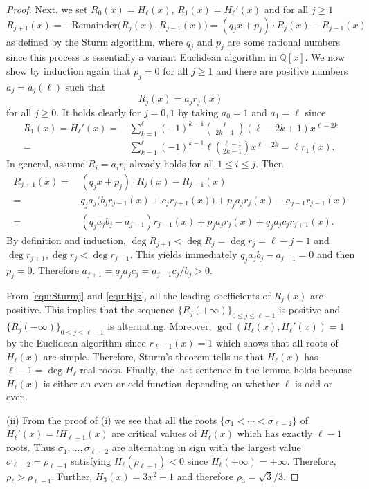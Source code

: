 \documentclass[11pt]{article}
\theoremstyle{plain}
\theoremstyle{definition}
\begin{document}
\begin{proof}
Next, we set $R_0(x)=H_{\ell}(x)$, $R_1(x)=H_{\ell}'(x)$ and for all $j\ge 1$
\begin{equation*}
     R_{j+1}(x)=-\text{Remainder}\big(R_j(x),R_{j-1}(x)\big)=(q_j x+p_j)\cdot R_j(x)-R_{j-1}(x)
\end{equation*}
as defined by the Sturm algorithm, where $q_j$ and $p_j$ are some rational numbers since this process
is essentially a variant Euclidean algorithm in ${\mathbb Q}[x]$.
We now show by induction again that $p_j=0$ for all $j\ge 1$
and there are positive numbers $a_j=a_j (\ell)$ such that
\begin{equation}\label{equ:Rjx}
     R_j(x)=a_j r_j(x)
\end{equation}
for all $j\ge 0$. It holds clearly for $j=0,1$ by taking $a_0=1$ and $a_1=\ell$ since
\begin{align*}
  R_1(x)=H_{\ell}'(x)=&\, \sum_{k=1}^\ell (-1)^{k-1} \binom{\ell}{2k-1}(\ell-2k+1) x^{\ell-2k}\\
  = &\,  \sum_{k=1}^\ell (-1)^{k-1} \ell \binom{\ell-1}{2k-1} x^{\ell-2k}= \ell r_1(x).
\end{align*}
In general, assume $R_{i}=a_i r_i$ already holds for all $1\le i\le j$. Then
\begin{align*}
     R_{j+1}(x)=&\, (q_j x+p_j)\cdot R_j(x)-R_{j-1}(x) \\
     =&\, q_ja_j \big(b_j r_{j-1}(x) +c_j r_{j+1}(x)\big)+p_j a_j r_j(x)-a_{j-1} r_{j-1}(x) \\
     =&\, (q_ja_jb_j-a_{j-1}) r_{j-1}(x)+p_j a_j r_j(x)+q_ja_j c_j r_{j+1}(x).
\end{align*}
By definition and induction, $\deg R_{j+1}<\deg R_j=\deg r_j=\ell-j-1$ and $\deg r_{j+1},\deg r_j<\deg r_{j-1}$.
This yields immediately $q_ja_jb_j-a_{j-1}=0$ and then $p_j=0$.
Therefore $a_{j+1}=q_ja_j c_j  =a_{j-1}c_j/b_j>0$.

From \eqref{equ:Sturmj} and  \eqref{equ:Rjx}, all the leading coefficients of $R_j(x)$ are positive.
This implies that the sequence
$\{R_j(+\infty)\}_{0\le j\le \ell-1}$ is positive and $\{R_j(-\infty)\}_{0\le j\le \ell-1}$ is alternating.
Moreover, $\gcd(H_{\ell}(x),H_{\ell}'(x))=1$ by the Euclidean algorithm since $r_{\ell-1}(x)=1$ which shows that all roots of $H_{\ell}(x)$ are simple.
Therefore, Sturm's theorem tells us that $H_{\ell}(x)$ has $\ell-1=\deg H_{\ell}$ real roots.
Finally, the last sentence in the lemma holds because $H_{\ell}(x)$ is either an even or odd function depending on whether $\ell$ is odd or even.

(ii) From the proof of (i) we see that all the roots $\{\sigma_1<\cdots<\sigma_{\ell-2}\}$  of $H_{\ell}'(x)=lH_{\ell-1}(x)$ are critical values of $H_\ell(x)$ which has exactly $\ell-1$ roots. Thus $ \sigma_1,\ldots,\sigma_{\ell-2}$ are alternating in sign with the largest value $\sigma_{\ell-2}=\rho_{\ell-1}$ satisfying $H_\ell(\rho_{\ell-1})<0$ since $H_\ell(+\infty)=+\infty$. Therefore, $\rho_\ell>\rho_{\ell-1}$. Further, $H_3(x)=3x^2-1$ and therefore $\rho_3=\sqrt{3}/3$.
\end{proof}
\end{document}
